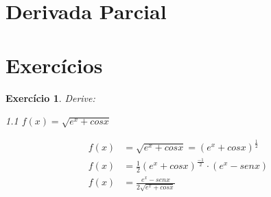 \documentclass{book}
\numberwithin{defn}{chapter}
\numberwithin{exe}{chapter}
\newtheorem{ex}{Exercício}
\numberwithin{ex}{chapter}
\numberwithin{obs}{chapter}
\numberwithin{fato}{chapter}
\newtheorem{resp}{Resposta}
\numberwithin{resp}{chapter}
\begin{document}
\section{Derivada Parcial} %


\section{Exercícios}
\begin{ex}
Derive:
\item 1.1 $f(x)=\sqrt{e^x+cosx}$ %

\begin{align*}
    f(x)&=\sqrt{e^x+cosx}=(e^x+cosx)^{\frac{1}{2}}\\
    f(x)&=\frac{1}{2}(e^x+cosx)^{\frac{-1}{2}}\cdot (e^x-senx)\\
    f(x)&=\frac{e^x-senx}{2\sqrt{e^x+cosx}}
\end{align*}

\begin{comment}
\begin{resp}
\item 1.2 $f(x)=e^{x+{\frac{1}{x}}}$ %

\begin{align*}
    f(x)&=e^{x+{\frac{1}{x}}}\\
    f'(x)&=e^{x^{10}+\frac{1}{x}}\cdot \left(10^{x^{9}}-\frac{1}{x^2}\right)
\end{align*}

\item 1.3 $f(x)=sen(e^x+9x^2)$ %

\begin{align*}
    f(x)&=sen(e^x+9x^2)\\
    f'(x)&=cos(e^x+9x^2)\cdot (e^x+18x)
\end{align*}

\item 1.4 $f(x)=\frac{3}{x^5+10x}$
\begin{align*}
    f(x)&=\frac{3}{x^5+10x}\\
    f'(x)&=3(x^5+10x)^{-1}\\
    f'(x)&=3(x^5+10x)^{-2}\cdot (5x^4+10)\\
    f'(x)&=\frac{15x^4+30}{(x^5+10x)^2}
\end{align*}


\item 1.5 $f(x)=x^4+\frac{90x^5}{\sqrt{x}}$ %
\begin{align*}
    f(x)&=x^4+\frac{90x^5}{\sqrt{x}}\\
    f'(x)&= x^4+90x^{\frac{9}{2}}\\
    f'(x)&=4x^3+405x^\frac{7}{2}
\end{align*}

\end{resp}
\end{comment}
\end{ex}
\end{document}
